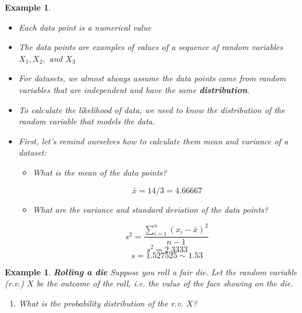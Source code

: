 \documentclass[12pt]{amsart}
\newtheorem{example}[theorem]{Example}
\begin{document}
{\begin{example}
\begin{itemize}
\item Each data point is a numerical value
\item The data points are examples of values of a sequence of random variables $X_1, X_2,$ and $X_3$
\item For datasets, we almost always assume the data points came from random variables that are independent and have the same \textbf{distribution}. 
\item To calculate the likelihood of data, we need to know the distribution of the random variable that models the data.

\item First, let's remind ourselves how to calculate them mean and variance of a dataset:
	\begin{itemize}
	\item What is the mean of the data points?

\color{blue}
$$\bar{x} = 14/3 = 4.66667$$
\color{black}
\vspace{1cm}
	\item What are the variance and standard deviation of the data points?

\color{blue}
$$
s^2 = \frac{\sum_{i=1}^n(x_i - \bar{x})^2}{n-1}
$$
$$s^2 = 2.3333$$
$$s = 1.527525 \sim 1.53$$
\color{black}

	\end{itemize}


\end{itemize}
\end{example} 

\newpage



\begin{example}  \textbf{Rolling a die} \newline
Suppose you roll a fair die. Let the random variable (r.v.) $X$ be the outcome of the roll, i.e. the value of the face showing on the die. 

\begin{enumerate}
\item What is the probability distribution of the r.v. $X$?
\vspace{3cm}


\end{enumerate}
\end{example}}
\end{document}
